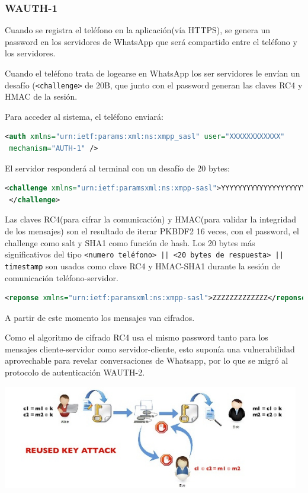 \documentclass[a4paper, 11pt]{article} %
\begin{document}
\subsubsection{WAUTH-1}
Cuando se registra el teléfono en la aplicación(vía HTTPS), se genera un password en los servidores de WhatsApp que será compartido
entre el teléfono y los servidores.

Cuando el teléfono trata de logearse en WhatsApp los ser servidores le envían un desafío (\texttt{<challenge>} de 20B, que junto con el
password generan las claves RC4 y HMAC de la sesión. 

Para acceder al sistema, el teléfono enviará:
\begin{lstlisting}[language=XML]
 <auth xmlns="urn:ietf:params:xml:ns:xmpp_sasl" user="XXXXXXXXXXXX"
 mechanism="AUTH-1" />
\end{lstlisting}

El servidor responderá al terminal con un desafío de 20 bytes:
\begin{lstlisting}[language=XML]
 <challenge xmlns="urn:ietf:paramsxml:ns:xmpp-sasl">YYYYYYYYYYYYYYYYYYYY
 </challenge>
\end{lstlisting}

Las claves RC4(para cifrar la comunicación) y HMAC(para validar la integridad de los mensajes) son el resultado 
de iterar PKBDF2 16 veces, con el password, el challenge como salt y SHA1 como función de hash. Los 20 bytes más
significativos del tipo \texttt{<numero teléfono> || <20 bytes de respuesta> || timestamp} son usados como clave
RC4 y HMAC-SHA1 durante la sesión de comunicación teléfono-servidor.

\begin{lstlisting}[language=XML]
 <reponse xmlns="urn:ietf:paramsxml:ns:xmpp-sasl">ZZZZZZZZZZZZZ</reponse>
\end{lstlisting}

A partir de este momento los mensajes van cifrados.

Como el algoritmo de cifrado RC4 usa el mismo password tanto para los mensajes cliente-servidor como servidor-cliente,
esto suponía una vulnerabilidad aprovechable para revelar conversaciones de Whatsapp, por lo que se migró al protocolo
de autenticación WAUTH-2.
    \begin{center}
      \includegraphics[width=13cm]{wauth-1.jpg}
    \end{center}
\end{document}
